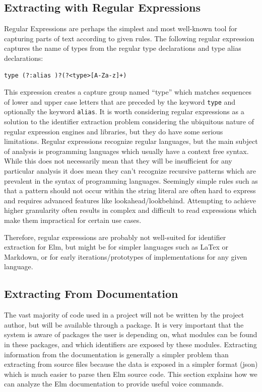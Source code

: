 \documentclass[../thesis.tex]{subfiles}
\begin{document}
\subsection{Extracting with Regular Expressions}
Regular Expressions are perhaps the simplest and most well-known tool for capturing parts of text according to given rules.
The following regular expression captures the name of types from the regular type declarations and type alias declarations:
\begin{verbatim}
type (?:alias )?(?<type>[A-Za-z]+)
\end{verbatim}
This expression creates a capture group named ``type'' which matches sequences of lower and upper case letters
that are preceded by the keyword \texttt{type} and optionally the keyword \texttt{alias}.
It is worth considering regular expressions as a solution to the identifier extraction problem
considering the ubiquitous nature of regular expression engines and libraries, but they do have some serious limitations.
Regular expressions recognize regular languages, but the main subject of analysis is programming languages
which usually have a context free syntax.
While this does not necessarily mean that they will be insufficient for any particular analysis
it does mean they can't recognize recursive patterns which are prevalent in the syntax of programming languages.
Seemingly simple rules such as that a pattern should not occur within the string literal are often
hard to express and requires advanced features like lookahead/lookbehind.
Attempting to achieve higher granularity often results in complex and difficult to read expressions
which make them impractical for certain use cases.

Therefore, regular expressions are probably not well-suited for identifier extraction for Elm, but might be for simpler languages
such as LaTex or Markdown, or for early iterations/prototypes of implementations for any given language.


\subsection{Extracting From Documentation}%
\label{sub:dependencies}
The vast majority of code used in a project will not be written by the project author, but will be available
through a package. It is very important that the system is aware of packages the user is depending on, what modules can be found in these packages, 
and which identifiers are exposed by these modules. Extracting information from the documentation is generally a simpler problem
than extracting from source files because the data is exposed in a simpler format (json) which is much easier to parse then Elm source code.
This section explains how we can analyze the Elm documentation to provide useful voice commands.
\end{document}
